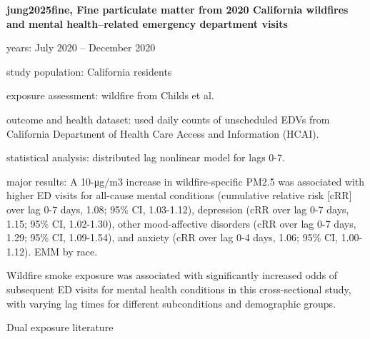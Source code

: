 \textbf{jung2025fine, Fine particulate matter from 2020 California wildfires and mental health--related emergency department visits}
    \item years: July 2020 -- December 2020
    \item study population: California residents
    \item exposure assessment: wildfire \PM from Childs et al. 
    \item outcome and health dataset: used daily counts of unscheduled EDVs from California Department of Health Care Access and Information (HCAI). 
    \item statistical analysis: distributed lag nonlinear model for lags 0-7. 
    \item major results: A 10-μg/m3 increase in wildfire-specific PM2.5 was associated with higher ED visits for all-cause mental conditions (cumulative relative risk [cRR] over lag 0-7 days, 1.08; 95\% CI, 1.03-1.12), depression (cRR over lag 0-7 days, 1.15; 95\% CI, 1.02-1.30), other mood-affective disorders (cRR over lag 0-7 days, 1.29; 95\% CI, 1.09-1.54), and anxiety (cRR over lag 0-4 days, 1.06; 95\% CI, 1.00-1.12). EMM by race. 
    \item Wildfire smoke exposure was associated with significantly increased odds of subsequent ED visits for mental health conditions in this cross-sectional study, with varying lag times for different subconditions and demographic groups.




Dual exposure literature
\citep{do2025spatiotemporal, sheridan2021individual, deng2022independent, lin2021immediate, lin2024joint, xu2025power, yamasaki2024heat, stone2023blackouts}

